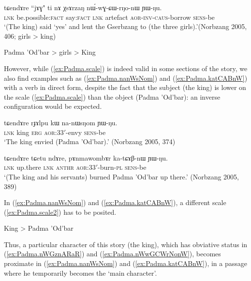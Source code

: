 \begin{exe}
\ex \label{ex:Padma.nWwGCWrNonW}
\gll  tɕendɤre ``jɤɣ" ti nɤ χsɤrzaŋ nɯ́-wɣ-ɕɯ-rŋo-nɯ ɲɯ-ŋu. \\
\textsc{lnk} be.possible:\textsc{fact} say:\textsc{fact} \textsc{lnk} artefact \textsc{aor}-\textsc{inv}-\textsc{caus}-borrow \textsc{sens}-be \\
\glt `(The king) said `yes' and lent the Gserbzang to (the three girls).'(Norbzang 2005, 406; girls > king)
\end{exe}

\begin{exe}
\ex \label{ex:Padma.scale}
\glt Padma 'Od'bar > girls > King
\end{exe}

However, while (\ref{ex:Padma.scale}) is indeed valid in some sections of the story, we also find examples such as (\ref{ex:Padma.nanWsNom}) and (\ref{ex:Padma.katCABnW}) with a verb in direct form, despite the fact that the subject (the king) is lower on the scale (\ref{ex:Padma.scale}) than the object (Padma 'Od'bar): an inverse configuration would be expected.

\begin{exe}
\ex \label{ex:Padma.nanWsNom}
\gll tɕendɤre rɟɤlpu kɯ na-nɯsŋom ɲɯ-ŋu. \\
\textsc{lnk} king \textsc{erg} \textsc{aor}:3\fl{}3$'$-envy \textsc{sens}-be \\
\glt `The king envied (Padma 'Od'bar).' (Norbzang 2005, 374)
\end{exe}

\begin{exe}
\ex \label{ex:Padma.katCABnW}
\gll tɕendɤre tɕetu ndɤre, pɤnmawombɤr ka-tɕɤβ-nɯ ɲɯ-ŋu.  \\
\textsc{lnk} up.there \textsc{lnk}  \textsc{anthr} \textsc{aor}:3\fl{}3$'$-burn-\textsc{pl} \textsc{sens}-be \\
\glt `(The king and his servants) burned Padma 'Od'bar up there.' (Norbzang 2005, 389)
\end{exe}

In (\ref{ex:Padma.nanWsNom}) and (\ref{ex:Padma.katCABnW}), a different scale (\ref{ex:Padma.scale2}) has to be posited.

\begin{exe}
\ex \label{ex:Padma.scale2}
\glt King > Padma 'Od'bar 
\end{exe}

Thus, a particular character of this story (the king), which has obviative status in (\ref{ex:Padma.nWGznARaR}) and (\ref{ex:Padma.nWwGCWrNonW}), becomes proximate in (\ref{ex:Padma.nanWsNom}) and (\ref{ex:Padma.katCABnW}), in a passage where he temporarily becomes the `main character'.

